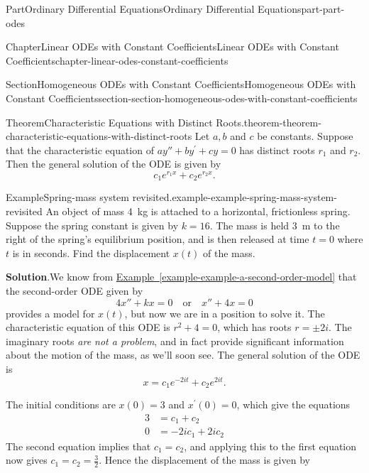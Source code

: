 \documentclass[twoside,10pt,]{book}
\newcommand{\blocktitlefont}{\relax}
\newcommand{\xreffont}{\relax}
\numberwithin{equation}{part}
\begin{document}
\begin{partptx}{Part}{Ordinary Differential Equations}{}{Ordinary Differential Equations}{}{}{part-part-odes}
\begin{chapterptx}{Chapter}{Linear ODEs with Constant Coefficients}{}{Linear ODEs with Constant Coefficients}{}{}{chapter-linear-odes-constant-coefficients}
\begin{sectionptx}{Section}{Homogeneous ODEs with Constant Coefficients}{}{Homogeneous ODEs with Constant Coefficients}{}{}{section-section-homogeneous-odes-with-constant-coefficients}
\begin{theorem}{Theorem}{Characteristic Equations with Distinct Roots.}{}{theorem-theorem-characteristic-equations-with-distinct-roots}%
Let \(a,b\) and \(c\) be constants. Suppose that the characteristic equation of \(ay'' + by^\prime + cy = 0\) has distinct roots \(r_{1}\) and \(r_{2}\). Then the general solution of the ODE is given by%
\begin{equation*}
c_{1}e^{r_{1}x} + c_{2}e^{r_{2}x}.
\end{equation*}
%
\end{theorem}
\begin{example}{Example}{Spring-mass system revisited.}{example-example-spring-mass-system-revisited}%
An object of mass \SI{4}{\kilo\gram} is attached to a horizontal, frictionless spring. Suppose the spring constant is given by \(k=16\). The mass is held \SI{3}{\meter} to the right of the spring's equilibrium position, and is then released at time \(t=0\) where \(t\) is in seconds. Find the displacement \(x(t)\) of the mass.%
\par\smallskip%
\noindent\textbf{\blocktitlefont Solution}.\hypertarget{solution-example-spring-mass-system-revisited-c}{}\quad{}We know from \hyperref[example-example-a-second-order-model]{Example~{\xreffont\ref{example-example-a-second-order-model}}} that the second-order ODE given by%
\begin{equation*}
4x'' + kx = 0\quad\text{or}\quad x'' + 4x = 0
\end{equation*}
provides a model for \(x(t)\), but now we are in a position to solve it. The characteristic equation of this ODE is \(r^{2} + 4 = 0\), which has roots \(r=\pm2i\). The imaginary roots \emph{are not a problem}, and in fact provide significant information about the motion of the mass, as we'll soon see. The general solution of the ODE is%
\begin{equation*}
x = c_{1}e^{-2it} + c_{2}e^{2it}.
\end{equation*}
%
\par
The initial conditions are \(x(0) = 3\) and \(x^\prime(0) = 0\), which give the equations%
\begin{align*}
3 & = c_{1} + c_{2} \\
0 & = -2ic_{1} + 2ic_{2} 
\end{align*}
The second equation implies that \(c_{1} = c_{2}\), and applying this to the first equation now gives \(c_{1} = c_{2} = \frac{3}{2}\). Hence the displacement of the mass is given by%
\begin{equation*}

\end{equation*}
\end{example}
\end{sectionptx}
\end{chapterptx}
\end{partptx}
\end{document}
